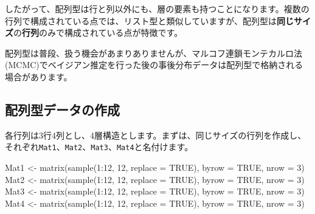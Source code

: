 \documentclass[
  a4paper,
  pandoc,
  ja=standard,
  jafont=haranoaji]{bxjsbook}
\newenvironment{Shaded}{\begin{snugshade}}{\end{snugshade}}
\newcommand{\AttributeTok}[1]{\textcolor[rgb]{0.00,0.48,0.65}{#1}}
\newcommand{\ConstantTok}[1]{\textcolor[rgb]{0.56,0.35,0.01}{#1}}
\newcommand{\DecValTok}[1]{\textcolor[rgb]{0.68,0.00,0.00}{#1}}
\newcommand{\FunctionTok}[1]{\textcolor[rgb]{0.28,0.35,0.67}{#1}}
\newcommand{\NormalTok}[1]{\textcolor[rgb]{0.00,0.48,0.65}{#1}}
\newcommand{\OtherTok}[1]{\textcolor[rgb]{0.00,0.48,0.65}{#1}}
\newcommand{\SpecialCharTok}[1]{\textcolor[rgb]{0.37,0.37,0.37}{#1}}
\begin{document}
したがって、配列型は行と列以外にも、層の要素も持つことになります。複数の行列で構成されている点では、リスト型と類似していますが、配列型は\textbf{同じサイズ}の\textbf{行列}のみで構成されている点が特徴です。

配列型は普段、扱う機会があまりありませんが、マルコフ連鎖モンテカルロ法
(MCMC)でベイジアン推定を行った後の事後分布データは配列型で格納される場合があります。

\hypertarget{ux914dux5217ux578bux30c7ux30fcux30bfux306eux4f5cux6210}{%
\subsection{配列型データの作成}\label{ux914dux5217ux578bux30c7ux30fcux30bfux306eux4f5cux6210}}

各行列は3行4列とし、4層構造とします。まずは、同じサイズの行列を作成し、それぞれ\texttt{Mat1}、\texttt{Mat2}、\texttt{Mat3}、\texttt{Mat4}と名付けます。

\begin{Shaded}
\begin{Highlighting}[numbers=left,,]
\NormalTok{Mat1 }\OtherTok{\textless{}{-}} \FunctionTok{matrix}\NormalTok{(}\FunctionTok{sample}\NormalTok{(}\DecValTok{1}\SpecialCharTok{:}\DecValTok{12}\NormalTok{, }\DecValTok{12}\NormalTok{, }\AttributeTok{replace =} \ConstantTok{TRUE}\NormalTok{), }\AttributeTok{byrow =} \ConstantTok{TRUE}\NormalTok{, }\AttributeTok{nrow =} \DecValTok{3}\NormalTok{)}
\NormalTok{Mat2 }\OtherTok{\textless{}{-}} \FunctionTok{matrix}\NormalTok{(}\FunctionTok{sample}\NormalTok{(}\DecValTok{1}\SpecialCharTok{:}\DecValTok{12}\NormalTok{, }\DecValTok{12}\NormalTok{, }\AttributeTok{replace =} \ConstantTok{TRUE}\NormalTok{), }\AttributeTok{byrow =} \ConstantTok{TRUE}\NormalTok{, }\AttributeTok{nrow =} \DecValTok{3}\NormalTok{)}
\NormalTok{Mat3 }\OtherTok{\textless{}{-}} \FunctionTok{matrix}\NormalTok{(}\FunctionTok{sample}\NormalTok{(}\DecValTok{1}\SpecialCharTok{:}\DecValTok{12}\NormalTok{, }\DecValTok{12}\NormalTok{, }\AttributeTok{replace =} \ConstantTok{TRUE}\NormalTok{), }\AttributeTok{byrow =} \ConstantTok{TRUE}\NormalTok{, }\AttributeTok{nrow =} \DecValTok{3}\NormalTok{)}
\NormalTok{Mat4 }\OtherTok{\textless{}{-}} \FunctionTok{matrix}\NormalTok{(}\FunctionTok{sample}\NormalTok{(}\DecValTok{1}\SpecialCharTok{:}\DecValTok{12}\NormalTok{, }\DecValTok{12}\NormalTok{, }\AttributeTok{replace =} \ConstantTok{TRUE}\NormalTok{), }\AttributeTok{byrow =} \ConstantTok{TRUE}\NormalTok{, }\AttributeTok{nrow =} \DecValTok{3}\NormalTok{)}
\end{Highlighting}
\end{Shaded}
\end{document}
